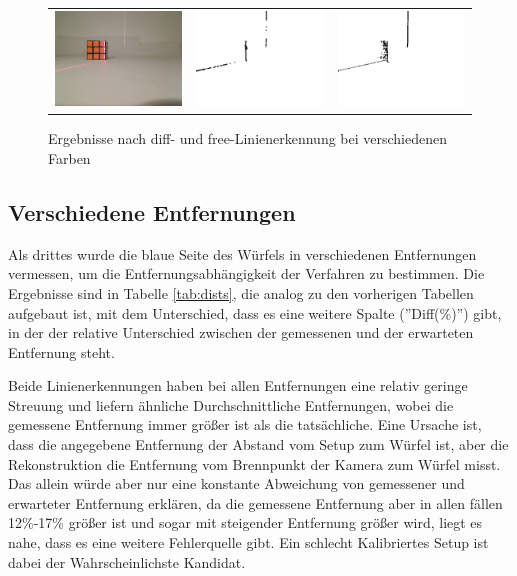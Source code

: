 \documentclass[ngerman,a4paper,parskip=half]{scrartcl}
\begin{document}
\begin{figure}[H]
\begin{tabular}{c|c|c}
		\includegraphics[width=.32\textwidth]{includes/orange_0.png} & 
		\includegraphics[width=.32\textwidth]{includes/orange_0_diff.png} &
		\includegraphics[width=.32\textwidth]{includes/orange_0_free.png}
		
	\end{tabular}
	\caption{Ergebnisse nach diff- und free-Linienerkennung bei verschiedenen Farben}
	\label{fig:cols}
\end{figure}

\subsection{Verschiedene Entfernungen}
\label{sec:dists}

Als drittes wurde die blaue Seite des Würfels in verschiedenen Entfernungen vermessen, um die Entfernungsabhängigkeit der Verfahren zu bestimmen. Die Ergebnisse sind in Tabelle \ref{tab:dists}, die analog zu den vorherigen Tabellen aufgebaut ist, mit dem Unterschied, dass es eine weitere Spalte (''Diff(\%)'') gibt, in der der relative Unterschied zwischen der gemessenen und der erwarteten Entfernung steht.

Beide Linienerkennungen haben bei allen Entfernungen eine relativ geringe Streuung und liefern ähnliche Durchschnittliche Entfernungen, wobei die gemessene Entfernung immer größer ist als die tatsächliche. Eine Ursache ist, dass die angegebene Entfernung der Abstand vom Setup zum Würfel ist, aber die Rekonstruktion die Entfernung vom Brennpunkt der Kamera zum Würfel misst. Das allein würde aber nur eine konstante Abweichung von gemessener und erwarteter Entfernung erklären, da die gemessene Entfernung aber in allen fällen 12\%-17\% größer ist und sogar mit steigender Entfernung größer wird, liegt es nahe, dass es eine weitere Fehlerquelle gibt. Ein schlecht Kalibriertes Setup ist dabei der Wahrscheinlichste Kandidat.
\end{document}
